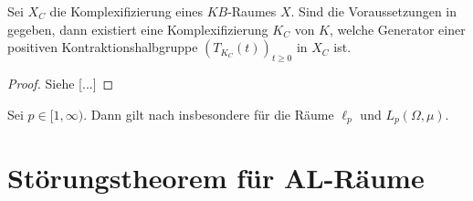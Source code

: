
\begin{fsatz}\label{Hauptaussage im Komplexen}
Sei $X_C$ die Komplexifizierung eines $KB$-Raumes $X$. Sind die Voraussetzungen in   gegeben, dann existiert eine Komplexifizierung $K_C$ von $K$, welche Generator einer positiven Kontraktionshalbgruppe $(T_{K_C}(t))_{t\geq0}$ in  $X_C$ ist.
\end{fsatz}

\begin{proof}
Siehe [...]
\end{proof}


\par
\begin{bem}
Sei $p\in[1,\infty)$. Dann gilt  nach \Cref{} insbesondere für die Räume $\ell_p$ und  $L_p(\Omega, \mu)$.
\end{bem}

\section{Störungstheorem für AL-Räume}


